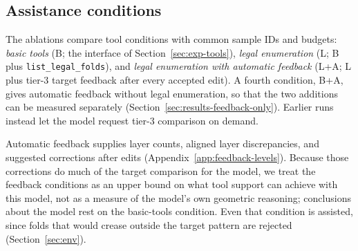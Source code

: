\subsection{Assistance conditions}
\label{sec:ablations}

The ablations compare tool conditions with common sample IDs and budgets: \emph{basic tools}
(B; the interface of Section~\ref{sec:exp-tools}), \emph{legal enumeration} (L; B plus
\texttt{list\_legal\_folds}), and \emph{legal enumeration with automatic feedback} (L+A; L plus
tier-3 target feedback after every accepted edit). A fourth condition, B+A, gives automatic
feedback without legal enumeration, so that the two additions can be measured separately
(Section~\ref{sec:results-feedback-only}). Earlier runs instead let the model request tier-3
comparison on demand.
\label{tab:ablations}

\label{sec:target-feedback}
Automatic feedback supplies layer counts, aligned layer discrepancies,
and suggested corrections after edits (Appendix~\ref{app:feedback-levels}). Because those
corrections do much of the target comparison for the model, we treat the feedback conditions as an upper
bound on what tool support can achieve with this model, not as a measure of the model's own geometric reasoning;
conclusions about the model rest on the basic-tools condition. Even that condition is assisted,
since folds that would crease outside the target pattern are rejected (Section~\ref{sec:env}).

